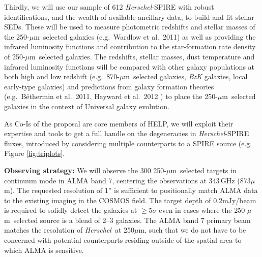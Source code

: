 \documentclass[12pt,a4paper]{article}
\newcommand{\herschel}{{\it Herschel}}
\newcommand{\micron}{$\mu$m}
\begin{document}
Thirdly, we will use our sample of 612 \herschel-SPIRE with robust identifications, and the wealth of available ancillary data, to build and fit
stellar SEDs. These will be used to measure photometric redshifts and
stellar masses of the 250-\micron\ selected galaxies (e.g.\ Wardlow et
al.\ 2011) as well as providing the infrared
luminosity functions and contribution to the star-formation rate
density of 250-\micron\ selected galaxies. The redshifts, stellar
masses, dust temperature and infrared luminosity functions will be
compared with other galaxy populations at both high and low redshift
(e.g.\ 870-\micron\ selected galaxies, {\it BzK} galaxies, local
early-type galaxies) and predictions from galaxy formation theories
(e.g.\ B\'ethermin et al.\ 2011, Hayward et al.\ 2012 ) to place the
250-\micron\ selected galaxies in the context of Universal galaxy
evolution.

As Co-Is of the proposal are core members of HELP, we will exploit their expertise and tools to get a full handle on the degeneracies in \herschel-SPIRE fluxes, introduced by considering multiple counterparts to a SPIRE source (e.g. Figure \ref{fig:triplots}.



\hspace{0.2cm}
{\bf Observing strategy:}
We will observe the 300 250-\micron\ selected targets in continuum
mode in ALMA band 7, centering the observations at 343\,GHz
(873\micron). 
%
The requested resolution of 1'' is sufficient to positionally match
ALMA data to the existing imaging in the COSMOS field. The target depth of 0.2mJy/beam
is required to solidly detect the galaxies at $\ge5\sigma$ even in
cases where the 250-\micron\ selected source is a blend of 2--3
galaxies. The ALMA band 7 primary beam matches the resolution of
\herschel\ at 250\micron, such that we do not have to be concerned
with potential counterparts residing outside of the spatial area to
which ALMA is sensitive.
\end{document}
